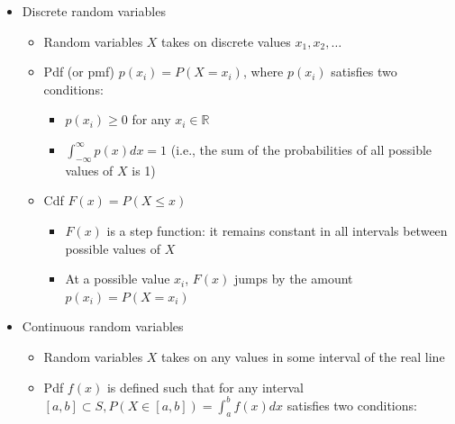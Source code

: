 \documentclass{article}
\begin{document}
\begin{itemize}
\begin{itemize}
        \item Bayes' rule: $A_1,\dots,A_n$ form a partition of the sample space, for any event $B$ where $P(B) > 0$, $P(A_j \mid B) = \frac{P(B \mid A_j)P(A_j)}{P(B)} = \frac{P(B \mid A_j)P(A_j)}{\sum_{i=1}^n P(B \mid A_i)P(A_i)}$
        \item Events $A$ and $B$ are independent if $P(A \cap B) = P(A)P(B)$ or $P(A \mid B) = P(A)$ or $P(B \mid A)=P(B)$
        \begin{itemize}
            \item Independence and mutually exclusive: one does not imply the other
            \item Independence of multiple events: any subset of events are independent
        \end{itemize}
    \end{itemize}
    \item Discrete random variables
    \begin{itemize}
        \item Random variables $X$ takes on discrete values $x_1,x_2,\dots$
        \item Pdf (or pmf) $p(x_i) = P(X=x_i)$, where $p(x_i)$ satisfies two conditions:
        \begin{itemize}
            \item $p(x_i) \ge 0$ for any $x_i \in \mathbb{R}$
            \item $\int_{-\infty}^\infty p(x)dx = 1$ (i.e., the sum of the probabilities of all possible values of $X$ is 1)
        \end{itemize}
        \item Cdf $F(x) = P(X \le x)$
        \begin{itemize}
            \item $F(x)$ is a step function: it remains constant in all intervals between possible values of $X$
            \item At a possible value $x_i$, $F(x)$ jumps by the amount $p(x_i)=P(X=x_i)$
        \end{itemize}
    \end{itemize}
    \item Continuous random variables
    \begin{itemize}
        \item Random variables $X$ takes on any values in some interval of the real line
        \item Pdf $f(x)$ is defined such that for any interval $[a,b] \subset S, P(X \in [a,b]) = \int_a^b f(x)dx$ satisfies two conditions:

\end{itemize}
\end{itemize}
\end{document}
